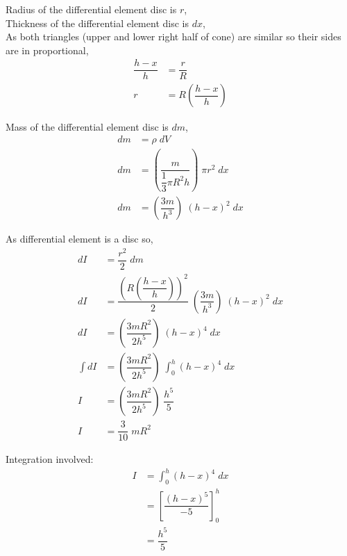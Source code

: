\documentclass[12 pt]{book}
\makeatletter
\newcommand*\Times{\fontfamily{ptm}\selectfont}
\newcommand{\physics}{\normalsize{\textcolor{head}{\textls*[100]{{\hspace*{75 mm} @10xphysics}}}}}
\newenvironment{note}
{
	\begin{center}
	\begin{itshape}
	\normalsize\Times\textit{}
}
{
	\end{itshape}
	\end{center}
}
\makeatother
\begin{document}
\begin{note}
Radius of the differential element disc is $r$, \\
Thickness of the differential element disc is $dx$, \\
As both triangles (upper and lower right half of cone) are similar so their sides are in proportional,
\begin{align*}
\dfrac{h-x}{h} &= \dfrac{r}{R} \\[2 mm]
r &= R \left( \dfrac{h-x}{h} \right)
\end{align*}

Mass of the differential element disc is $dm$, 
\begin{align*}
dm &= \rho \; dV \\
dm &= \left(  \dfrac{m}{\dfrac{1}{3} \pi R^2h} \right)  \; \pi r^2 \; dx \\[2 mm]
dm &= \left(  \dfrac{3m}{h^3} \right)  \; \left( h-x \right)^2 \; dx 
\end{align*}

\pagebreak

As differential element is a disc so,\\
\begin{align*}
dI &= \dfrac{r^2}{2}  \; dm \\[3 mm]
dI &= \dfrac{\left( R \left( \dfrac{h-x}{h} \right) \right)^2}{2} \; \left(  \dfrac{3m}{h^3} \right)  \; \left( h-x \right)^2 \; dx \\[3 mm]
dI &= \left(  \dfrac{3mR^2}{2h^5} \right)  \; \left( h-x \right)^4 \; dx \\[3 mm]
\int dI &= \left(  \dfrac{3mR^2}{2h^5} \right)  \; \int_0^h \left( h-x \right)^4 \; dx \\[3 mm]
I &= \left(  \dfrac{3mR^2}{2h^5} \right) \; \dfrac{h^5}{5} \\[3 mm]
I &= \dfrac{3}{10} \; mR^2 
\end{align*}

\pagebreak

\thispagestyle{empty}
Integration involved: 
\begin{align*}
I &= \int_0^h \left( h-x \right)^4 \; dx\\[4 mm]
 &= \left[ \dfrac{\left(h-x\right)^5}{-5} \right]_0^h \\[4 mm]
 &= \dfrac{h^5}{5}
\end{align*}
\end{note}

{\physics}

\pagebreak
\end{document}
